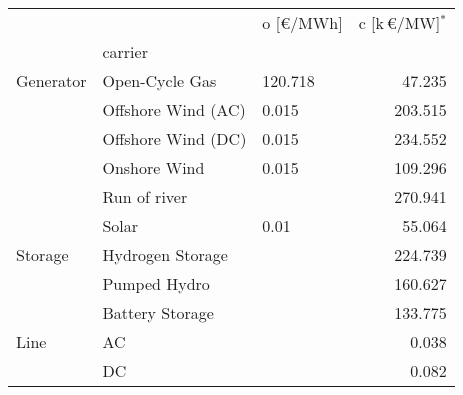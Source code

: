 \begin{tabular}{lllr}
\toprule
     &    & o [\euro/MWh] &  c [k\,\euro/MW]$^*$ \\
{} & carrier &               &                      \\
\midrule
Generator & Open-Cycle Gas &       120.718 &               47.235 \\
     & Offshore Wind (AC) &         0.015 &              203.515 \\
     & Offshore Wind (DC) &         0.015 &              234.552 \\
     & Onshore Wind &         0.015 &              109.296 \\
     & Run of river &               &              270.941 \\
     & Solar &          0.01 &               55.064 \\
Storage & Hydrogen Storage &               &              224.739 \\
     & Pumped Hydro &               &              160.627 \\
     & Battery Storage &               &              133.775 \\
Line & AC &               &                0.038 \\
     & DC &               &                0.082 \\
\bottomrule
\end{tabular}
